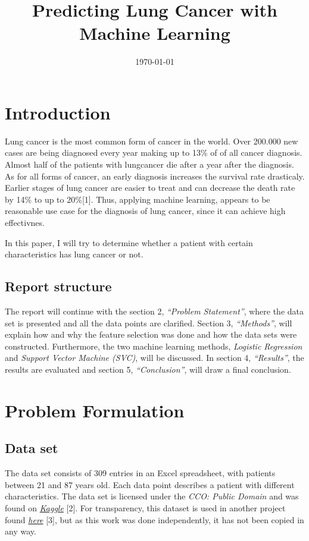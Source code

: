 \documentclass[a4paper,12pt]{article}
\date{\today}
\title{Predicting Lung Cancer with Machine Learning}
\begin{document}
\maketitle
\section{Introduction}
\label{sec:org95b9c50}
Lung cancer is the most common form of cancer in the world. Over 200.000 new cases are being diagnosed every year making up to 13\% of of all cancer diagnosis. Almost half of the patients with lungcancer die after a year after the diagnosis.
As for all forms of cancer, an early diagnosis increases the survival rate drasticaly. Earlier stages of lung cancer are easier to treat and can decrease the death rate by 14\% to up to 20\%[1].
Thus, applying machine learning, appears to be reasonable use case for the diagnosis of lung cancer, since it can achieve high effectivnes.

In this paper, I will try to determine whether a patient with certain characteristics has lung cancer or not.

\subsection{Report structure}
\label{sec:org74050f3}
The report will continue with the section 2, \emph{``Problem Statement''}, where the data set is presented and all the data points are clarified.
Section 3, \emph{``Methods''}, will explain how and why the feature selection was done and how the data sets were constructed.
Furthermore, the two machine learning methods, \emph{Logistic Regression} and \emph{Support Vector Machine (SVC)}, will be discussed.
In section 4, \emph{``Results''}, the results are evaluated and section 5, \emph{``Conclusion''}, will draw a final conclusion.

\section{Problem Formulation}
\label{sec:org0eaafe5}

\subsection{Data set}
\label{sec:orgc626aa8}
The data set consists of 309 entries in an Excel spreadsheet, with patients between 21 and 87 years old.
Each data point describes a patient with different characteristics.
The data set is licensed under the \emph{CCO: Public Domain} and was found on \emph{\href{https://www.kaggle.com/datasets/mysarahmadbhat/lung-cancer}{Kaggle}} [2].
For transparency, this dataset is used in another project found \emph{\href{https://www.kaggle.com/code/gaganmaahi224/lung-cancer-5ml-models-full-analysis-plotly}{here}} [3], but as this work was done independently, it has not been copied in any way.
\end{document}
